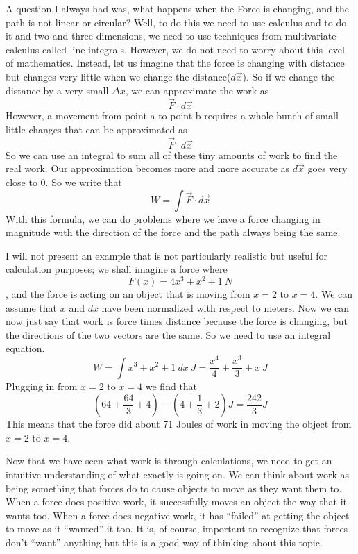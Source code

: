 A question I always had was, what happens when the Force is changing, and the path is not linear or circular? Well, to do this we need to use calculus and to do it and two and three dimensions, we need to use techniques from multivariate calculus called line integrals. However, we do not need to worry about this level of mathematics. Instead, let us imagine that the force is changing with distance but changes very little when we change the distance($d\vec{x}$). So if we change the distance by a very small $\Delta x$, we can approximate the work as $$\vec{F} \cdot d\vec{x}$$ However, a movement from point a to point b requires a whole bunch of small little changes that can be approximated as $$\vec{F} \cdot d\vec{x}$$ So we can use an integral to sum all of these tiny amounts of work to find the real work. Our approximation becomes more and more accurate as $d\vec{x}$ goes very close to 0. So we write that \begin{equation}W=\int{\vec{F} \cdot d\vec{x}}\end{equation} With this formula, we can do problems where we have a force changing in magnitude with the direction of the force and the path always being the same.

I will not present an example that is not particularly realistic but useful for calculation purposes; we shall imagine a force where \begin{equation}F\left(x\right)=4x^3+x^2+1 \ N\end{equation}, and the force is acting on an object that is moving from $x=2$ to $x=4$. We can assume that $x$ and $dx$ have been normalized with respect to meters. Now we can now just say that work is force times distance because the force is changing, but the directions of the two vectors are the same. So we need to use an integral equation. \begin{equation}W=\int x^3+x^2+1 \ dx \ J= \frac{x^4}{4}+\frac{x^3}{3}+x \ J\end{equation} Plugging in from $x=2$ to $x=4$ we find that   $$\left(64+\frac{64}{3}+4\right)-\left(4+\frac{1}{3}+2\right) J= \frac{242}{3} J$$ This means that the force did about 71 Joules of work in moving the object from $x=2$ to $x=4$. 

Now that we have seen what work is through calculations, we need to get an intuitive understanding of what exactly is going on. We can think about work as being something that forces do to cause objects to move as they want them to. When a force does positive work, it successfully moves an object the way that it wants too. When a force does negative work, it has “failed” at getting the object to move as it “wanted” it too. It is, of course, important to recognize that forces don’t “want” anything but this is a good way of thinking about this topic. 

